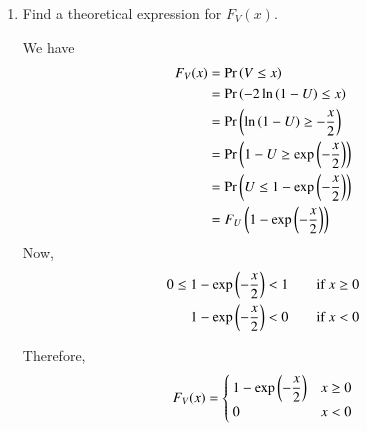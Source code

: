 \documentclass[journal,12pt,twocolumn]{IEEEtran}
\renewcommand\thesection{\arabic{section}}
\begin{document}
\begin{enumerate}[label=\thesection.\arabic*
,ref=\thesection.\theenumi]
\item Find a theoretical expression for $F_V(x)$.

\solution We have
\begin{align}
	F_V(x) &= \Pr\left(V \le x\right) \\
	&= \Pr\left(-2\ln\left(1-U\right) \le x\right) \\
	&= \Pr\left(\ln\left(1-U\right) \ge -\frac{x}{2}\right) \\
	&= \Pr\left(1-U \ge \exp\left(-\frac{x}{2}\right)\right) \\
	&= \Pr\left(U \le 1 - \exp\left(-\frac{x}{2}\right)\right) \\
	&= F_U\left(1 - \exp\left(-\frac{x}{2}\right)\right)
\end{align}
Now,
\begin{align}
	0 \le 1-\exp\left(-\frac{x}{2}\right) &< 1 \qquad \text{if } x \ge 0	\\	
	1-\exp\left(-\frac{x}{2}\right) &< 0 \qquad \text{if } x < 0	
\end{align}

Therefore,
\begin{align}
	F_V(x) = 
	\begin{cases}
		1-\exp\left(-\dfrac{x}{2}\right) & x \ge 0 \\
		0 & x < 0
	\end{cases}
\end{align}

\end{enumerate}
\end{document}
